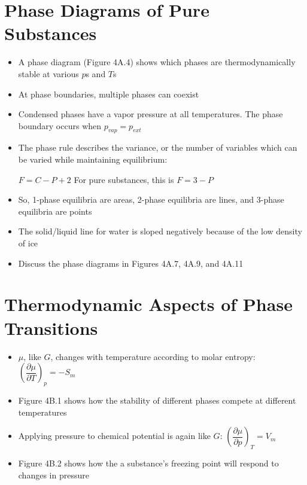 \documentclass[12pt, openany, letterpaper]{memoir}
\begin{document}
\section{Phase Diagrams of Pure Substances}
\begin{itemize}
	\item A phase diagram (Figure 4A.4) shows which phases are thermodynamically stable at various $p$s and $T$s
	\item At phase boundaries, multiple phases can coexist
	\item Condensed phases have a vapor pressure at all temperatures. The phase boundary occurs when $p_{vap}=p_{ext}$
	\item The phase rule describes the variance, or the number of variables which can be varied while maintaining equilibrium:

	      $F=C-P+2$ \hspace{3em} For pure substances, this is $F=3-P$
	\item So, 1-phase equilibria are areas, 2-phase equilibria are lines, and 3-phase equilibria are points
	\item The solid/liquid line for water is sloped negatively because of the low density of ice
	\item Discuss the phase diagrams in Figures 4A.7, 4A.9, and 4A.11
\end{itemize}

\section{Thermodynamic Aspects of Phase Transitions}
\begin{itemize}
	\item $\mu$, like $G$, changes with temperature according to molar entropy: $\left(\dfrac{\partial \mu}{\partial T}\right)_p=-S_m$
	\item Figure 4B.1 shows how the stability of different phases compete at different temperatures
	\item Applying pressure to chemical potential is again like $G$: $\left(\dfrac{\partial \mu}{\partial p}\right)_T=V_m$
	\item Figure 4B.2 shows how the a substance's freezing point will respond to changes in pressure
\end{itemize}
\end{document}
